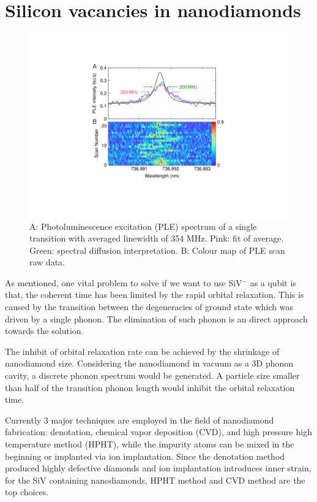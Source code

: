 \section[Silicon vacancies in nanodiamonds]{Silicon vacancies in nanodiamonds}
\begin{figure}[h]
\centering
\includegraphics[width=1\linewidth]{Figures/pic/PLEUwe}
\caption{A: Photoluminescence excitation (PLE) spectrum of a single transition with averaged linewidth of 354 MHz. Pink: fit of average. Green: spectral diffusion interpretation. B: Colour map of PLE scan raw data. \citep{jantzen_nanodiamonds_2016}}
\label{fig:PLEUwe}
\end{figure}
As mentioned, one vital problem to solve if we want to use SiV$^{-}$ as a qubit is that, the coherent time has been limited by the rapid orbital relaxation. This is caused by the transition between the degeneracies of ground state which was driven by a single phonon. The elimination of such phonon is an direct approach towards the solution.

The inhibit of orbital relaxation rate can be achieved by the shrinkage of nanodiamond size. Considering the nanodiamond in vacuum as a 3D phonon cavity, a discrete phonon spectrum would be generated. \citep{albrecht_coupling_2013} A particle size smaller than half of the transition phonon length would inhibit the orbital relaxation time. \citep{kleppner_inhibited_1981}

Currently 3 major techniques are employed in the field of nanodiamond fabrication: denotation, chemical vapor deposition (CVD), and high pressure high temperature method (HPHT), while the impurity atoms can be mixed in the beginning or implanted via ion implantation. Since the denotation method produced highly defective diamonds and ion implantation introduces inner strain, for the SiV containing nanodiamonds, HPHT method and CVD method are the top choices.

